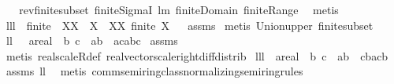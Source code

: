\begin{isabellebody}
\isadelimproof
\ %
\endisadelimproof
%
\isatagproof
{}\isamarkupfalse%
\ \isanewline
rev{\isacharunderscore}finite{\isacharunderscore}subset\ finite{\isacharunderscore}SigmaI\ lm{}{}\ finite{\isacharunderscore}Domain\ finite{\isacharunderscore}Range\ \isamarkupfalse%
\ metis%
\endisatagproof
{\isafoldproof}%
%
\isadelimproof
%
\endisadelimproof
\isanewline
\isanewline
{}\isamarkupfalse%
\ lll{}{}{\isacharcolon}\ \ {\isachardoublequoteopen}finite\ {\isacharparenleft}{\isasymUnion}\ XX{\isacharparenright}{\isachardoublequoteclose}\ \ {\isachardoublequoteopen}{\isasymforall}X\ {\isasymin}\ XX{\isachardot}\ finite\ X{\isachardoublequoteclose}%
\isadelimproof
\ %
\endisadelimproof
%
\isatagproof
{}\isamarkupfalse%
\ assms\isanewline
{}\isamarkupfalse%
\ {\isacharparenleft}metis\ Union{\isacharunderscore}upper\ finite{\isacharunderscore}subset{\isacharparenright}%
\endisatagproof
{\isafoldproof}%
%
\isadelimproof
%
\endisadelimproof
\isanewline
\isanewline
{}\isamarkupfalse%
\ ll{}{}{\isacharcolon}\ \ \ a{\isacharcolon}{\isacharcolon}real\ \ b\ c\ \ {\isachardoublequoteopen}a{\isacharasterisk}b\ {\isacharminus}\ a{\isacharasterisk}c{\isacharequal}a{\isacharasterisk}{\isacharparenleft}b{\isacharminus}c{\isacharparenright}{\isachardoublequoteclose}\isanewline
%
\isadelimproof
%
\endisadelimproof
%
\isatagproof
{}\isamarkupfalse%
\ assms\ \isamarkupfalse%
\ {\isacharparenleft}metis\ real{\isacharunderscore}scaleR{\isacharunderscore}def\ real{\isacharunderscore}vector{\isachardot}scale{\isacharunderscore}right{\isacharunderscore}diff{\isacharunderscore}distrib{\isacharparenright}%
\endisatagproof
{\isafoldproof}%
%
\isadelimproof
\isanewline
%
\endisadelimproof
\isanewline
{}\isamarkupfalse%
\ lll{}{}{\isacharcolon}\ \ a{\isacharcolon}{\isacharcolon}real\ \ b\ c\ \ {\isachardoublequoteopen}a{\isacharasterisk}b\ {\isacharminus}\ c{\isacharasterisk}b{\isacharequal}{\isacharparenleft}a{\isacharminus}c{\isacharparenright}{\isacharasterisk}b{\isachardoublequoteclose}\ \isanewline
%
\isadelimproof
%
\endisadelimproof
%
\isatagproof
{}\isamarkupfalse%
\ assms\ ll{}{}\ \isamarkupfalse%
\ {\isacharparenleft}metis\ comm{\isacharunderscore}semiring{\isacharunderscore}{}{\isacharunderscore}class{\isachardot}normalizing{\isacharunderscore}semiring{\isacharunderscore}rules{\isacharparenleft}{}{\isacharparenright}{\isacharparenright}%

\end{isabellebody}
